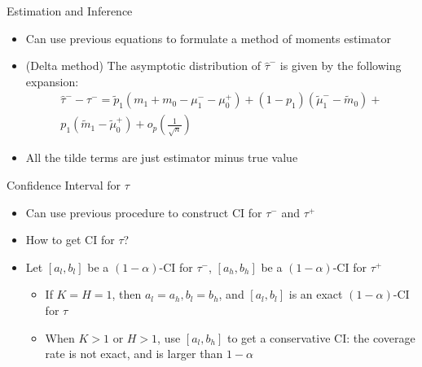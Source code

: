 \documentclass{beamer}					%
\begin{document}
\begin{frame}{Estimation and Inference}
    \begin{itemize}
        \item Can use previous equations to formulate a method of moments estimator
        \item (Delta method) The asymptotic distribution of $\hat{\tau}^-$ is given by the following expansion:
        \begin{align*}
            \hat{\tau}^{-} - \tau^- = \tilde{p}_1 (m_1 + m_0 - \mu_1^- - \mu_0^+) + (1- p_1)(\tilde{\mu}_1^- - \tilde{m}_0) + \\p_1 (\tilde{m}_1 - \tilde{\mu}_0^+) + o_p(\frac{1}{\sqrt{n}})
        \end{align*}
        \item All the tilde terms are just estimator minus true value

    \end{itemize}
\end{frame}

\begin{frame}{Confidence Interval for $\tau$}
    \begin{itemize}
        \item Can use previous procedure to construct CI for $\tau^-$ and $\tau^+$
        \item How to get CI for $\tau$?
        \item Let $[a_l, b_l]$ be a $(1-\alpha)$-CI for $\tau^-$, $[a_h, b_h]$ be a $(1-\alpha)$-CI for $\tau^+$
        \begin{itemize}
            \item If $K = H = 1$, then $a_l = a_h, b_l = b_h$, and $[a_l, b_l]$ is an exact $(1-\alpha)$-CI for $\tau$
            \item When $K > 1$ or $H > 1$, use $[a_l, b_h]$ to get a conservative CI: the coverage rate is not exact, and is larger than $1-\alpha$
        \end{itemize}
    \end{itemize}
\end{frame}
\end{document}
